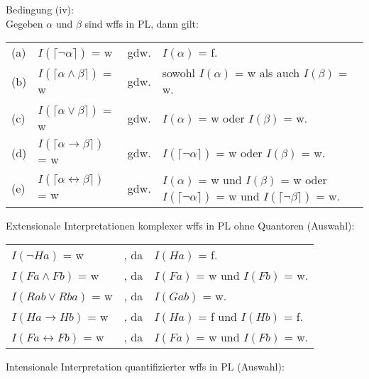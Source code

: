 \documentclass{scrartcl}
\begin{document}
Bedingung (iv): \\
Gegeben $ \alpha $ und $ \beta $ sind wffs in PL, dann gilt: \\
\begin{tabularx}{\linewidth}{l l l X}
	(a) & $ I(\lceil \neg \alpha \rceil) $ = w & gdw. & $ I(\alpha) $ = f. \\
	(b) & $ I(\lceil \alpha \wedge \beta \rceil) $ = w & gdw. & sowohl $ I(\alpha) $ = w als auch $ I(\beta) $ = w. \\
	(c) & $ I(\lceil \alpha \vee \beta \rceil) $ = w & gdw. & $ I(\alpha) $ = w oder $ I(\beta) $ = w. \\
	(d) & $ I(\lceil \alpha \rightarrow \beta \rceil) $ = w & gdw. & $ I(\lceil \neg \alpha \rceil) $ = w oder $ I(\beta) $ = w. \\
	(e) & $ I(\lceil \alpha \leftrightarrow \beta \rceil) $ = w & gdw. & $ I(\alpha) $ = w und $ I(\beta) $ = w oder $ I(\lceil \neg \alpha \rceil) $ = w und $ I(\lceil \neg \beta \rceil) $ = w.
\end{tabularx}

Extensionale Interpretationen komplexer wffs in PL ohne Quantoren (Auswahl): \\

\begin{tabularx}{\linewidth}{l l l}
	$ I(\neg Ha) $ = w & , da & $ I(Ha) $ = f. \\
	$ I(Fa \wedge Fb) $ = w & , da & $ I(Fa) $ = w und $ I(Fb) $ = w. \\
	$ I(Rab \vee Rba) $ = w & , da & $ I(Gab) $ = w. \\
	$ I(Ha \rightarrow Hb) $ = w & , da & $ I(Ha) $ = f und $ I(Hb) $ = f. \\
	$ I(Fa \leftrightarrow Fb) $ = w & , da & $ I(Fa) $ = w und $ I(Fb) $ = w. \\
\end{tabularx}

Intensionale Interpretation quantifizierter wffs in PL (Auswahl): \\
\end{document}
